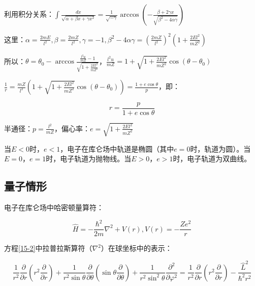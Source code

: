 利用积分关系：$\int {\frac{{dx}}{{\sqrt {\alpha  + \beta x + \gamma x^2 } }} = \frac{1}{{\sqrt { - \gamma } }}} \arccos \left( { - \frac{{\beta  + 2\gamma x}}{{\sqrt {\beta ^2  - 4\alpha \gamma } }}} \right)$

这里：$\alpha  = \frac{{2mE}}{{l^2 }},\beta  = \frac{{2mZ}}{{l^2 }},\gamma  =  - 1,\beta ^2  - 4\alpha \gamma  = \left( {\frac{{2mZ}}{{l^2 }}} \right)^2 \left( {1 + \frac{{2El^2 }}{{mZ^2 }}} \right)$

所以：$\theta  = \theta _0  - \arccos \frac{{\frac{{l^2 u}}{{mZ}} - 1}}{{\sqrt {1 + \frac{{2El^2 }}{{mZ^2 }}} }}$，$\frac{{l^2 u}}{{mZ}} = 1 + \sqrt {1 + \frac{{2El^2 }}{{mZ^2 }}} \cos \left( {\theta  - \theta _0 } \right)$

$\frac{1}{r} = \frac{{mZ}}{{l^2 }}\left( {1 + \sqrt {1 + \frac{{2El^2 }}{{mZ^2 }}} \cos \left( {\theta  - \theta _0 } \right)} \right) = \frac{{1 + e\cos \theta }}{p}$，即：

\begin{equation}\label{15-1}
r = \frac{p}{{1 + e\cos \theta }}
\end{equation}

半通径：$p = \frac{{l^2 }}{{mZ}}$，偏心率：$e = \sqrt {1 + \frac{{2El^2 }}{{mZ^2 }}} $

当$E < 0$时，$e < 1$，电子在库仑场中轨道是椭圆（其中$e = 0$时，轨道为圆）。当$E = 0$，$e = 1$时，电子轨道为抛物线。当$E > 0$，$e > 1$时，电子轨道为双曲线。

\subsection{量子情形}

电子在库仑场中哈密顿量算符：

\begin{equation}\label{15-2}
\widehat H =  - \frac{{\hbar ^2 }}{{2m}}\nabla ^2  + V(r), V(r) =  - \frac{{Ze^2 }}{r}
\end{equation}

方程\ref{15-2}中拉普拉斯算符（$\nabla ^2$）在球坐标中的表示：

\begin{equation}\label{15-3}
 \frac{1}{{r^2 }}\frac{\partial }{{\partial r}}\left( {r^2 \frac{\partial }{{\partial r}}} \right) + \frac{1}{{r^2 \sin \theta }}\frac{\partial }{{\partial \theta }}\left( {\sin \theta \frac{\partial }{{\partial \theta }}} \right) + \frac{1}{{r^2 \sin ^2 \theta }}\frac{{\partial ^2 }}{{\partial \varphi ^2 }} = \frac{1}{{r^2 }}\frac{\partial }{{\partial r}}\left( {r^2 \frac{\partial }{{\partial r}}} \right) - \frac{{\widehat L^2 }}{{\hbar ^2 r^2 }}
\end{equation}

